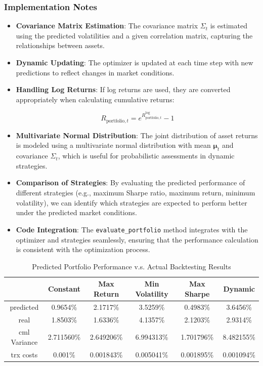 \subsubsection{Implementation Notes}

\begin{itemize}
    \item \textbf{Covariance Matrix Estimation}: The covariance matrix \( \Sigma_t \) is estimated using the predicted volatilities and a given correlation matrix, capturing the relationships between assets.

    \item \textbf{Dynamic Updating}: The optimizer is updated at each time step with new predictions to reflect changes in market conditions.

    \item \textbf{Handling Log Returns}: If log returns are used, they are converted appropriately when calculating cumulative returns:

    \[
    R_{\text{portfolio}, t} = e^{R_{\text{portfolio}, t}^{\text{log}}} - 1
    \]

    \item \textbf{Multivariate Normal Distribution}: The joint distribution of asset returns is modeled using a multivariate normal distribution with mean \( \boldsymbol{\mu}_t \) and covariance \( \Sigma_t \), which is useful for probabilistic assessments in dynamic strategies.

    \item \textbf{Comparison of Strategies}: By evaluating the predicted performance of different strategies (e.g., maximum Sharpe ratio, maximum return, minimum volatility), we can identify which strategies are expected to perform better under the predicted market conditions.

    \item \textbf{Code Integration}: The \texttt{evaluate\_portfolio} method integrates with the optimizer and strategies seamlessly, ensuring that the performance calculation is consistent with the optimization process.
\end{itemize}

\begin{table}[htbp]
\centering
\caption{Predicted Portfolio Performance v.s. Actual Backtesting Results}
\label{tab:predicted_vs_actual}
\begin{tabular}{c|ccccc}
\toprule
 &\textbf{Constant} & \textbf{Max Return} & \textbf{Min Volatility} & \textbf{Max Sharpe} & \textbf{Dynamic} \\
\midrule
predicted&0.9654\%  & 2.1717\% & 3.5259\% & 0.4983\% & 3.6456\% \\
real&1.8503\% & 1.6336\% & 4.1357\% & 2.1203\% & 2.9314\% \\
cml Variance& 2.711560\% & 2.649206\% & 6.994313\% & 1.701796\% & 8.482155\% \\
trx costs&0.001\% & 0.001843\% & 0.005041\% & 0.001895\% & 0.001094\% \\


\bottomrule
\end{tabular}
\end{table}

